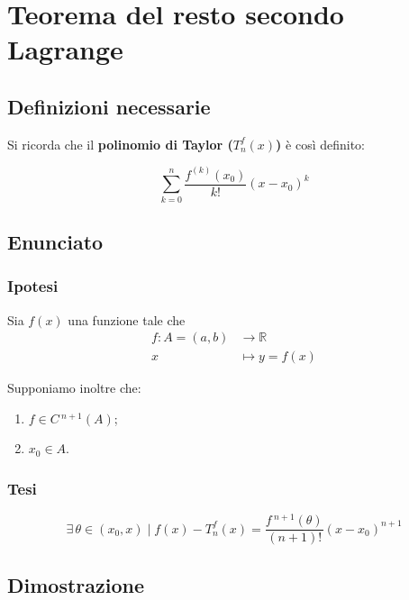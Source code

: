 \documentclass[../dimostrazioni]{subfiles}
\begin{document}
    \chapter{Teorema del resto secondo Lagrange}
    \label{teorestoLagrange}

        \section*{Definizioni necessarie}

            Si ricorda che il \textbf{polinomio di Taylor (\(T _n ^ f (x) \))} è così definito:

            \[ \sum_{k = 0}^{n} \frac{f^{(k)} (x_0)}{k!}(x-x_0)^k\]

        \section*{Enunciato}

            \subsection*{Ipotesi}

                Sia \(f(x)\) una funzione tale che
                \begin{align*}
                    f : A = (a, b) &\longrightarrow \mathbb{R}\\
                    x &\longmapsto y = f(x) 
                \end{align*}

                Supponiamo inoltre che:

                \begin{enumerate}
                    \indentitem \item \(f \in C\,^{n+1} (A) \);
                    \indentitem \item \(x_0 \in A\).
                \end{enumerate}

            \subsection*{Tesi}

                \[  \exists \, \theta \in (x_0, x) \; | \; f(x) - T _n ^ f (x) = \frac{f\,^{n+1}(\theta)}{(n+1)!}(x-x_0)^{n+1} \]

        \section*{Dimostrazione}
\end{document}
